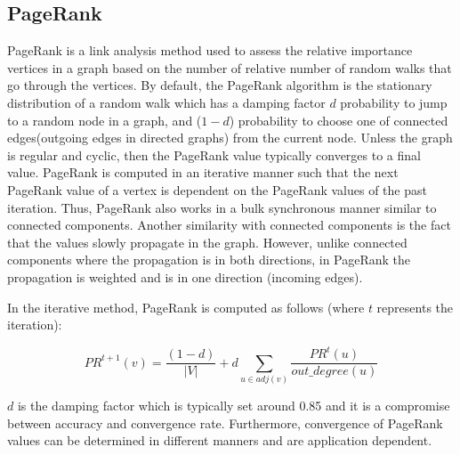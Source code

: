 



\subsection{PageRank}
PageRank is a link analysis method used to assess the relative importance vertices in a graph based on the number of relative number of random walks that go through the vertices. By default, the PageRank algorithm is the stationary distribution of a random walk which has a damping factor ${d}$ probability to jump to a random node in a graph, and ($1-{d}$) probability to choose one of connected edges(outgoing edges in directed graphs) from the current node. Unless the graph is regular and cyclic, then the PageRank value typically converges to a final value. PageRank is computed in an iterative manner such that the next PageRank value of a vertex is dependent on the PageRank values of the past iteration. Thus, PageRank also works in a bulk synchronous manner similar to connected components. Another similarity with connected components is the fact that the values slowly propagate in the graph. However, unlike connected components where the propagation is in both directions, in PageRank the propagation is weighted and is in one direction (incoming edges).

In the iterative method, PageRank is computed as follows (where $t$ represents the iteration):

\begin{equation}
\label{equ:pagerank}
PR^{t+1}(v) = \frac{(1-d)}{|V|} + d\sum_{u\in adj(v)} \frac{PR^t(u)}{out\_degree(u)}
\end{equation}

${d}$ is the damping factor which is typically set around 0.85 and it is a compromise between accuracy and convergence rate. Furthermore, convergence of PageRank values can be determined in different manners and are application dependent.

